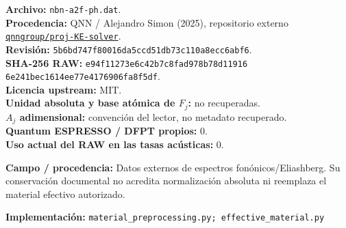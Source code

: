 \documentclass[11pt,a4paper]{article}
\newcommand{\sourcecode}[1]{\par{\footnotesize\color{ink}\textbf{Implementación:} \texttt{#1}}\par}
\newcommand{\origin}[1]{\par{\footnotesize\color{ink}\textbf{Campo / procedencia:} #1}\par}
\begin{document}
{\small
\textbf{Archivo:} \texttt{nbn-a2f-ph.dat}.\\
\textbf{Procedencia:} QNN / Alejandro Simon (2025), repositorio externo
\href{https://github.com/qnngroup/proj-KE-solver}{\texttt{qnngroup/proj-KE-solver}}.\\
\textbf{Revisión:} \texttt{5b6bd747f80016da5ccd51db73c110a8ecc6abf6}.\\
\textbf{SHA-256 RAW:} \texttt{e94f11273e6c42b7c8fad978b78d11916}\\
\hspace*{28mm}\texttt{6e241bec1614ee77e4176906fa8f5df}.\\
\textbf{Licencia upstream:} MIT.\\
\textbf{Unidad absoluta y base atómica de \(F_j\):} no recuperadas.\\
\textbf{\(A_j\) adimensional:} convención del lector, no metadato recuperado.\\
\textbf{Quantum ESPRESSO / DFPT propios:} \(0\).\\
\textbf{Uso actual del RAW en las tasas acústicas:} \(0\).
}
\vfill
\origin{Datos externos de espectros fonónicos/Eliashberg. Su conservación documental no acredita normalización absoluta ni reemplaza el material efectivo autorizado.}
\sourcecode{material\_preprocessing.py; effective\_material.py}
\end{document}
